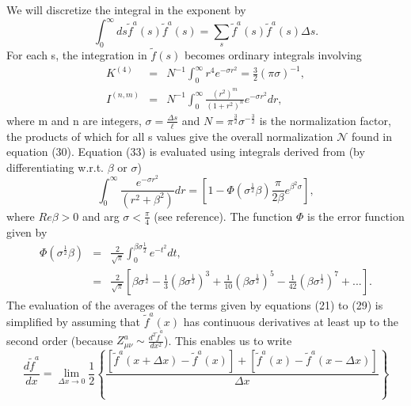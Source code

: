 \documentclass[a4paper,12pt]{article}
\begin{document}
We will discretize the integral in the exponent by
\begin{equation}\label{18}
\int^{\infty}_{0}ds\tilde{f}^{a}(s)\tilde{f}^{a}(s) = \sum_{s}\tilde{f}^{a}(s)\tilde{f}^{a}(s)\Delta s.
\end{equation}
For each s, the integration in $\tilde{f}(s)$ becomes ordinary integrals involving
\begin{eqnarray}\label{19}
K^{(4)} &=& N^{-1}\int^{\infty}_{0}r^{4}e^{-\sigma r^{2}}=\frac{3}{2}(\pi\sigma)^{-1},\\
I^{(n,m)} &=& N^{-1}\int^{\infty}_{0}\frac{(r^{2})^{m}}{(1+r^{2})^{n}}e^{-\sigma r^{2}}dr,
\end{eqnarray}
where m and n are integers, $\sigma = \frac{\Delta s}{\ell}$ and $N = \pi^{\frac{3}{2}}\sigma^{-\frac{3}{2}}$ is the normalization factor, the products of which for all s values give the overall normalization $\mathcal{N}$ found in equation (30).  Equation (33) is evaluated using integrals derived from (by differentiating w.r.t. $\beta$ or $\sigma$)
\begin{equation}\label{20}
\int^{\infty}_{0}\frac{e^{-\sigma r^{2}}}{(r^{2}+\beta^{2})}dr = [1-\Phi(\sigma^{\frac{1}{2}}\beta)\frac{\pi}{2\beta}e^{\beta^{2}\sigma}],
\end{equation}
where $Re\beta > 0$ and arg $\sigma<\frac{\pi}{4}$ (see reference\cite{integral}). The function $\Phi$ is the error function given by
\begin{eqnarray}\label{21}
\Phi(\sigma^{\frac{1}{2}}\beta) &=& \frac{2}{\sqrt{\pi}}\int^{\beta\sigma\frac{1}{2}}_{0}e^{-t^{2}}dt,\nonumber\\
&=&\frac{2}{\sqrt{\pi}}[\beta\sigma^{\frac{1}{2}}-\frac{1}{3}(\beta\sigma^{\frac{1}{2}})^{3}+\frac{1}{10}(\beta\sigma^{\frac{1}{2}})^{5}-\frac{1}{42}(\beta\sigma^{\frac{1}{2}})^{7}+...].
\end{eqnarray}
The evaluation of the averages of the terms given by equations (21) to (29) is  simplified by assuming that $\tilde{f}^{a}(x)$ has continuous derivatives at least up to the second order (because $Z^{a}_{\mu\nu}\sim\frac{d^{2}\tilde{f}^{a}}{dx^{2}}$).  This enables us to write
\begin{equation}\label{22}
\frac{d\tilde{f}^{a}}{dx}=\lim_{\Delta x\to 0}\frac{1}{2}\left\{\frac{[\tilde{f}^{a}(x+\Delta x)-\tilde{f}^{a}(x)]+[\tilde{f}^{a}(x)-\tilde{f}^{a}(x-\Delta x)]}{\Delta x}\right\}
\end{equation}
\end{document}
